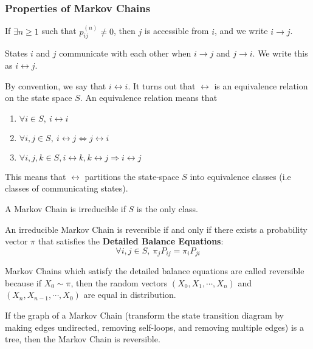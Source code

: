\subsubsection{Properties of Markov Chains}
\begin{definition}
	If $\exists n \geq 1$ such that $p_{ij}^{(n)} \ne 0$, then $j$ is accessible from $i$, and we write $i\rightarrow j$.
	\label{defn:accesible}
\end{definition}
\begin{definition}
	States $i$ and $j$ communicate with each other when $i\rightarrow j$ and $j\rightarrow i$. We write this as $i\leftrightarrow j$.
	\label{defn:communicate}
\end{definition}
By convention, we say that $i\leftrightarrow i$.
It turns out that $\leftrightarrow$ is an equivalence relation on the state space $S$.
An equivalence relation means that 
\begin{enumerate}
	\item $\forall i\in S,\ i \leftrightarrow i$
	\item $\forall i,j\in S,\ i\leftrightarrow j \Leftrightarrow j \leftrightarrow i$
	\item $\forall i,j,k \in S, i\leftrightarrow k, k\leftrightarrow j \Rightarrow i \leftrightarrow j$
\end{enumerate}
This means that $\leftrightarrow$ partitions the state-space $S$ into equivalence classes (i.e classes of communicating states).
\begin{definition}
	A Markov Chain is irreducible if $S$ is the only class.
	\label{defn:irreducible-markov}
\end{definition}
\begin{definition}
	An irreducible Markov Chain is reversible if and only if there exists a probability vector $\pi$ that satisfies the \textbf{Detailed Balance Equations}: \[
		\forall i,j \in S,\ \pi_j P_{ij} = \pi_i P_{ji}
	\]
	\label{defn:reversible-markov}
\end{definition}
Markov Chains which satisfy the detailed balance equations are called reversible because if $X_0\sim \pi$, then the random vectors $(X_0, X_1, \cdots, X_n)$ and $(X_n, X_{n-1}, \cdots, X_0)$ are equal in distribution.
\begin{theorem}
	If the graph of a Markov Chain (transform the state transition diagram by making edges undirected, removing self-loops, and removing multiple edges) is a tree, then the Markov Chain is reversible.
	\label{thm:tree-markov}
\end{theorem}
